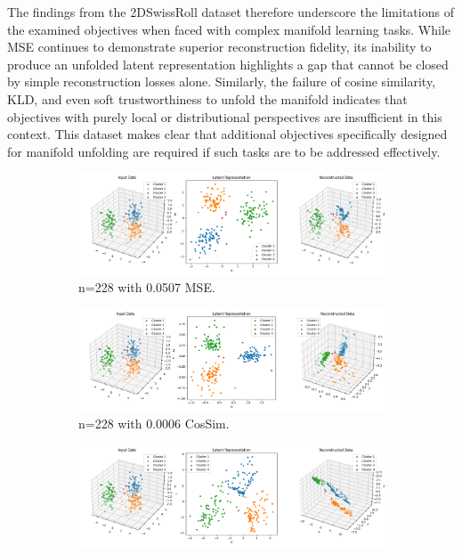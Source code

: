 The findings from the 2DSwissRoll dataset therefore underscore the limitations of the examined objectives when faced with complex manifold learning tasks. While MSE continues to demonstrate superior reconstruction fidelity, its inability to produce an unfolded latent representation highlights a gap that cannot be closed by simple reconstruction losses alone. Similarly, the failure of cosine similarity, KLD, and even soft trustworthiness to unfold the manifold indicates that objectives with purely local or distributional perspectives are insufficient in this context. This dataset makes clear that additional objectives specifically designed for manifold unfolding are required if such tasks are to be addressed effectively.

\begin{figure}[htbp]
  \centering
  \begin{subfigure}[b]{1.0\textwidth}
    \centering
    \includegraphics[width=\linewidth]{images/RQ2/mse/3DBlobsS_-1_0.0507.png}
    \caption{n=228 with 0.0507 MSE.}
    \label{fig:RQ2/mse/3DBlobsS}
  \end{subfigure}
  \hfill
  \begin{subfigure}[b]{1.0\textwidth}
    \centering
    \includegraphics[width=\linewidth]{images/RQ2/csi/3DBlobsS_-1_0.0006.png}
    \caption{n=228 with 0.0006 CosSim.}
    \label{fig:RQ2/csi/3DBlobsS}
  \end{subfigure}
  \hfill
  \begin{subfigure}[b]{1.0\textwidth}
    \centering
    \includegraphics[width=\linewidth]{images/RQ2/kld/3DBlobsS_-1_0.0002.png}

\end{subfigure}
\end{figure}
